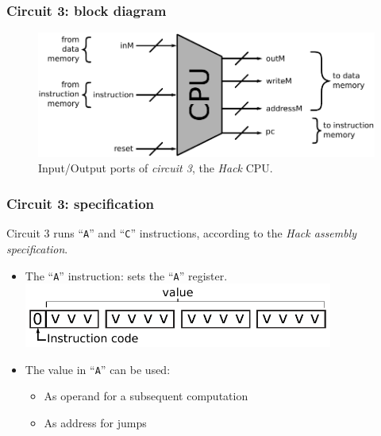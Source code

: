         \begin{frame}
            \frametitle{Circuit 3: block diagram}

            \begin{figure}[h!]
                \centerline{\includegraphics[width=1.0\textwidth]{imgs/cpu-block.pdf}}
                \caption{Input/Output ports of \emph{circuit 3}, the \emph{Hack} CPU.
                    \label{fig:cpu-block}}
            \end{figure}
        \end{frame}

        \begin{frame}
            \frametitle{Circuit 3: specification}

            \par{Circuit 3 runs ``\texttt{A}'' and ``\texttt{C}'' instructions, according to the \emph{Hack assembly specification}.}
            \vspace{0.3cm}

            \begin{itemize}
                \item The ``\texttt{A}'' instruction: sets the ``\texttt{A}'' register.
                    \includegraphics[width=0.8\textwidth]{imgs/cpu-instruction-a.pdf}
                \vspace{0.5cm}
                \item The value in ``\texttt{A}'' can be used:
                    \begin{itemize}
                        \item As operand for a subsequent computation
                        \item As address for jumps
                    \end{itemize}
            \end{itemize}

        \end{frame}

